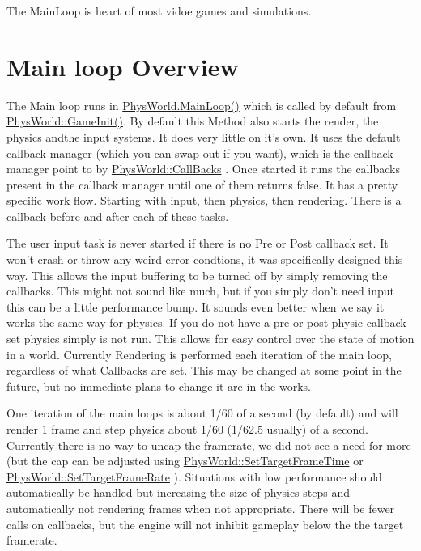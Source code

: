 The MainLoop is heart of most vidoe games and simulations.\hypertarget{dd/d99/mainloop1_overview1}{}\section{Main loop Overview}\label{dd/d99/mainloop1_overview1}
The Main loop runs in \hyperlink{classPhysWorld_ad41cad0347b6f5ba7ec05568aaffa514}{PhysWorld.MainLoop()} which is called by default from \hyperlink{classPhysWorld_a92cf86cdb716bdd762b4029e95b1ee8f}{PhysWorld::GameInit()}. By default this Method also starts the render, the physics andthe input systems. It does very little on it's own. It uses the default callback manager (which you can swap out if you want), which is the callback manager point to by \hyperlink{classPhysWorld_a080ea6f1584374b07d3c1f29c7ed64df}{PhysWorld::CallBacks} . Once started it runs the callbacks present in the callback manager until one of them returns false. It has a pretty specific work flow. Starting with input, then physics, then rendering. There is a callback before and after each of these tasks. \par
 \par
 The user input task is never started if there is no Pre or Post callback set. It won't crash or throw any weird error condtions, it was specifically designed this way. This allows the input buffering to be turned off by simply removing the callbacks. This might not sound like much, but if you simply don't need input this can be a little performance bump. It sounds even better when we say it works the same way for physics. If you do not have a pre or post physic callback set physics simply is not run. This allows for easy control over the state of motion in a world. Currently Rendering is performed each iteration of the main loop, regardless of what Callbacks are set. This may be changed at some point in the future, but no immediate plans to change it are in the works. \par
 \par
 One iteration of the main loops is about 1/60 of a second (by default) and will render 1 frame and step physics about 1/60 (1/62.5 usually) of a second. Currently there is no way to uncap the framerate, we did not see a need for more (but the cap can be adjusted using \hyperlink{classPhysWorld_a5375f0e42292087a345d8fd7c84c0b8b}{PhysWorld::SetTargetFrameTime} or \hyperlink{classPhysWorld_a7182be8b59c54a7b7caafc80c5bef2ad}{PhysWorld::SetTargetFrameRate} ). Situations with low performance should automatically be handled but increasing the size of physics steps and automatically not rendering frames when not appropriate. There will be fewer calls on callbacks, but the engine will not inhibit gameplay below the the target framerate. \par
